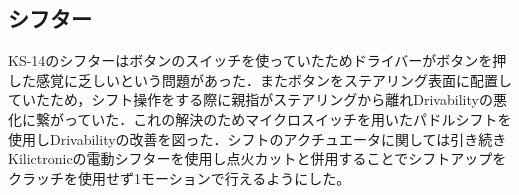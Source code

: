 \subsection{シフター}
KS-14のシフターはボタンのスイッチを使っていたためドライバーがボタンを押した感覚に乏しいという問題があった．またボタンをステアリング表面に配置していたため，シフト操作をする際に親指がステアリングから離れDrivabilityの悪化に繋がっていた．これの解決のためマイクロスイッチを用いたパドルシフトを使用しDrivabilityの改善を図った．シフトのアクチュエータに関しては引き続きKilictronicの電動シフターを使用し点火カットと併用することでシフトアップをクラッチを使用せず1モーションで行えるようにした。
